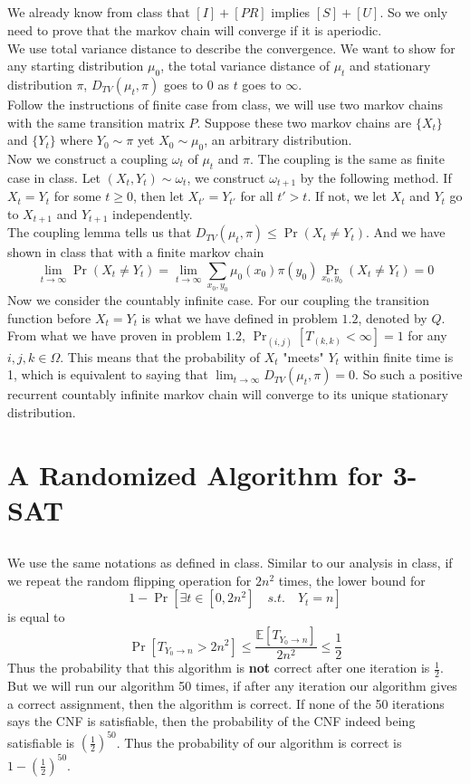 \documentclass[12pt,letterpaper]{article}
\begin{document}
\subsection{}
We already know from class that $[I]+[PR]$ implies $[S]+[U]$.
So we only need to prove that the markov chain will converge if it is aperiodic.\\
We use total variance distance to describe the convergence. 
We want to show for any starting distribution $\mu_0$, 
the total variance distance of $\mu_t$ and stationary distribution $\pi$, $D_{TV}(\mu_t,\pi)$
goes to $0$ as $t$ goes to $\infty$.\\
Follow the instructions of finite case from class, 
we will use two markov chains with the same transition matrix $P$.
Suppose these two markov chains are $\{X_t\}$ and $\{Y_t\}$ where $Y_0\sim\pi$ yet $X_0\sim\mu_0$, an arbitrary distribution.\\
Now we construct a coupling $\omega_t$ of $\mu_t$ and $\pi$.
The coupling is the same as finite case in class.
Let $(X_t,Y_t)\sim\omega_t$, we construct $\omega_{t+1}$ by the following method.
If $X_t=Y_t$ for some $t\geq 0$, then let $X_{t'}=Y_{t'}$ for all $t'>t$. 
If not, we let $X_t$ and $Y_t$ go to $X_{t+1}$ and $Y_{t+1}$ independently.\\
The coupling lemma tells us that $D_{TV}(\mu_t,\pi)\leq\Pr(X_t\neq Y_t)$. 
And we have shown in class that with a finite markov chain 
$$\lim_{t\to\infty}\Pr(X_t\neq Y_t)=\lim_{t\to\infty}\sum_{x_{0},y_{0}}\mu_{0}(x_0)\pi(y_0)\Pr_{x_0,y_0}(X_t\neq Y_t)=0$$
Now we consider the countably infinite case. For our coupling the transition function before $X_t=Y_t$ is what we have defined in problem $1.2$, denoted by $Q$.
From what we have proven in problem $1.2$, $\Pr_{(i,j)}[T_{(k,k)}<\infty]=1$ for any $i,j,k\in\Omega$.
This means that the probability of $X_t$ "meets" $Y_t$ within finite time is 1,
which is equivalent to saying that $\lim_{t\to\infty}D_{TV}(\mu_t,\pi)=0$.
So such a positive recurrent countably infinite markov chain will converge to its unique stationary distribution.


\newpage
\section{A Randomized Algorithm for 3-SAT}
\subsection{}
We use the same notations as defined in class.
Similar to our analysis in class, 
if we repeat the random flipping operation for $2n^2$ times,
the lower bound for 
$$1-\Pr\left[\exists t\in [0,2n^2]\quad s.t.\quad Y_t=n\right]$$
is equal to 
$$\Pr\left[T_{Y_0\to n}>2n^2\right]\leq\frac{\mathbb{E}[T_{Y_0\to n}]}{2n^2}\leq\frac{1}{2}$$
Thus the probability that this algorithm is \textbf{not} correct 
after one iteration is $\frac{1}{2}$.
But we will run our algorithm 50 times, 
if after any iteration our algorithm gives a correct assignment,
then the algorithm is correct.
If none of the 50 iterations says the CNF is satisfiable,
then the probability of the CNF indeed being satisfiable is 
$(\frac{1}{2})^{50}$.
Thus the probability of our algorithm is correct is $1-(\frac{1}{2})^{50}$.
\end{document}
